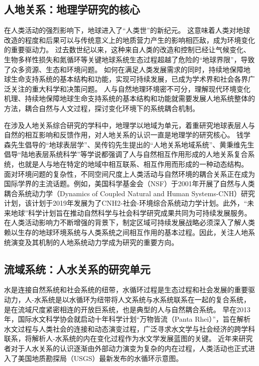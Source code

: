 \subsection{人地关系：地理学研究的核心}

在人类活动的强烈影响下，地球进入了“人类世”的新纪元。
这意味着人类对地球改造的程度和后果可以与传统意义上的地质营力产生的影响相匹敌，成为环境变化的重要驱动力\cite{lenton2019, lewis2015, lewis2018}。
过去数世纪以来，这种来自人类的改造和控制已经让气候变化、生物多样性损失和氮循环等关键地球系统生态过程超越了危险的“地球界限”，导致了众多资源、生态和环境问题\cite{steffen2015}。
如何在满足人类发展需求的同时，持续地保障地球生命支持系统的基本结构和功能，实现可持续发展，已成为学术界和社会各界广泛关注的重大科学和决策问题\cite{wu2014}。
人与自然地理环境密不可分，理解现代环境变化机理、持续地保障地球生命支持系统的基本结构和功能就需要发展人地系统整体的方法，耦合自然与人文过程，探讨变化环境下的系统耦合机制\cite{fu2015}。

在涉及人地关系综合研究的学科中，地理学以地域为单元，着重研究地球表层人与自然的相互影响和反馈作用，对人地关系的认识一直是地理学的研究核心\cite{wu1991}。
钱学森先生倡导的“地球表层学”、吴传钧先生提出的“人地关系地域系统”、黄秉维先生倡导“陆地表层系统科学”等学说都强调了人与自然相互作用形成的人地关系复合系统，也就是人与地在特定的地域中相互联系、相互作用而形成的一种动态结构。
面对环境问题的复杂性，不同空间尺度上人类活动与自然环境的耦合关系正在成为国际学界的主流话题。例如，美国科学基金会（NSF）于2001年开展了自然与人类耦合系统动力学（Dynamics of Coupled Natural and Human Systems-CNH）研究计划，该计划于2019年发展为了CNH2-社会-环境综合系统动力学计划。此外，“未来地球”科学计划旨在推动自然科学与社会科学研究成果共同为可持续发展服务\cite{fu2015}。
在人类活动影响力不断增强的背景下，制定区域可持续发展战略必须深入了解人类赖以生存的地球环境系统与人类系统之间相互作用的基本过程。因此，关注人地系统演变及其机制的人地系统动力学成为研究的重要方向\cite{fu2022}。

\subsection{流域系统：人水关系的研究单元}

水是连接自然系统和社会系统的纽带，水循环过程是生态过程和社会发展的重要驱动力，人-水系统是以水循环为纽带将人文系统与水系统联系在一起的复合系统，是在流域尺度紧密相连的开放巨系统，也是典型的人与自然耦合系统\cite{li2007}。
早在2013年，国际水文科学协会就启动十年科学计划“万物皆流（Panta Rhei）”，旨在解析水文过程与人类社会的连接和动态演变过程\cite{montanari2013}，广泛寻求水文学与社会经济的跨学科联系，将解析人-水系统的内在变化过程作为水文学发展蓝图的关键。
近年来研究者对于人水关系的认识逐渐由外部动力演变为复杂的内在过程，人类活动也正式进入了美国地质勘探局（USGS）最新发布的水循环示意图\cite{abbott2019, abbott2019a}。

